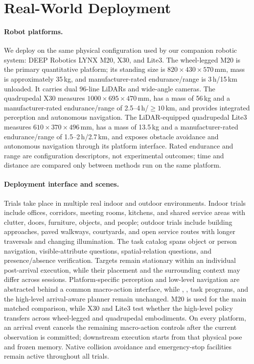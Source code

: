 \section{Real-World Deployment}
\label{app:realworld}

\paragraph{Robot platforms.}
We deploy \method{} on the same physical configuration used by our companion robotic system: DEEP Robotics LYNX M20, X30, and Lite3.
The wheel-legged M20 is the primary quantitative platform; its standing size is $820\times430\times570$\,mm, mass is approximately 35\,kg, and manufacturer-rated endurance/range is 3\,h/15\,km unloaded.
It carries dual 96-line LiDARs and wide-angle cameras.
The quadrupedal X30 measures $1000\times695\times470$\,mm, has a mass of 56\,kg and a manufacturer-rated endurance/range of 2.5--4\,h/$\geq10$\,km, and provides integrated perception and autonomous navigation.
The LiDAR-equipped quadrupedal Lite3 measures $610\times370\times496$\,mm, has a mass of 13.5\,kg and a manufacturer-rated endurance/range of 1.5--2\,h/2.7\,km, and exposes obstacle avoidance and autonomous navigation through its platform interface.
Rated endurance and range are configuration descriptors, not experimental outcomes; time and distance are compared only between methods run on the same platform.

\paragraph{Deployment interface and scenes.}
Trials take place in multiple real indoor and outdoor environments.
Indoor trials include offices, corridors, meeting rooms, kitchens, and shared service areas with clutter, doors, furniture, objects, and people; outdoor trials include building approaches, paved walkways, courtyards, and open service routes with longer traversals and changing illumination.
The task catalog spans object or person navigation, visible-attribute questions, spatial-relation questions, and presence/absence verification.
Targets remain stationary within an individual post-arrival execution, while their placement and the surrounding context may differ across sessions.
Platform-specific perception and low-level navigation are abstracted behind a common macro-action interface, while \rfm{}, \jet{}, task programs, and the high-level arrival-aware planner remain unchanged.
M20 is used for the main matched comparison, while X30 and Lite3 test whether the high-level policy transfers across wheel-legged and quadrupedal embodiments.
On every platform, an arrival event cancels the remaining macro-action controls after the current observation is committed; downstream execution starts from that physical pose and frozen memory.
Native collision avoidance and emergency-stop facilities remain active throughout all trials.

